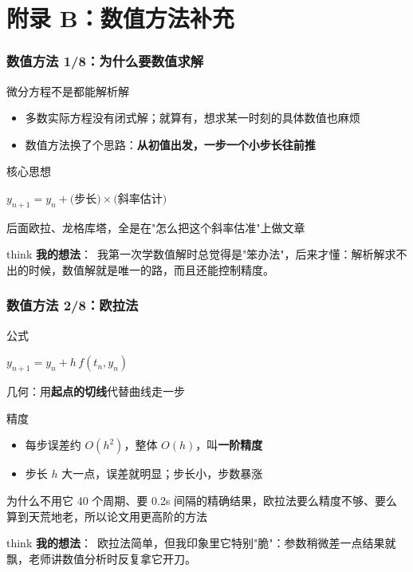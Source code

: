 \documentclass[aspectratio=169]{beamer}
\newcommand{\remark}[2]{%
	\vspace{0.12cm}%
	\begin{beamercolorbox}[rounded=true,sep=6pt]{think}%
		{\color{orchidpurple}\textbf{#1}：}~#2%
	\end{beamercolorbox}%
}
\begin{document}
\section*{附录 B：数值方法补充}
\begin{frame}
	\frametitle{数值方法 1/8：为什么要数值求解}
	\scriptsize
	\begin{block}{微分方程不是都能解析解}
		\begin{itemize}
			\item 多数实际方程没有闭式解；就算有，想求某一时刻的具体数值也麻烦
			\item 数值方法换了个思路：\textbf{从初值出发，一步一个小步长往前推}
		\end{itemize}
	\end{block}
	\begin{block}{核心思想}
		\begin{center}
			$y_{n+1}=y_n+\text{(步长)}\times\text{(斜率估计)}$
		\end{center}
		后面欧拉、龙格库塔，全是在"怎么把这个斜率估准"上做文章
	\end{block}
	\remark{我的想法}{我第一次学数值解时总觉得是"笨办法"，后来才懂：解析解求不出的时候，数值解就是唯一的路，而且还能控制精度。}
\end{frame}

\begin{frame}
	\frametitle{数值方法 2/8：欧拉法}
	\scriptsize
	\begin{block}{公式}
		\begin{center}
			$y_{n+1}=y_n+h\,f(t_n,y_n)$
		\end{center}
		几何：用\textbf{起点的切线}代替曲线走一步
	\end{block}
	\begin{block}{精度}
		\begin{itemize}
			\item 每步误差约 $O(h^2)$，整体 $O(h)$，叫\textbf{一阶精度}
			\item 步长 $h$ 大一点，误差就明显；步长小，步数暴涨
		\end{itemize}
	\end{block}
	\begin{block}{为什么不用它}
		40 个周期、要 0.2s 间隔的精确结果，欧拉法要么精度不够、要么算到天荒地老，所以论文用更高阶的方法
	\end{block}
	\remark{我的想法}{欧拉法简单，但我印象里它特别"脆"：参数稍微差一点结果就飘，老师讲数值分析时反复拿它开刀。}
\end{frame}
\end{document}
